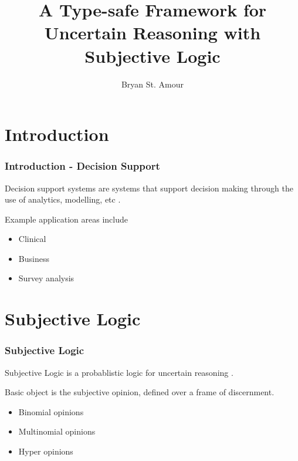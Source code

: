 \documentclass{beamer}
\title{A Type-safe Framework for Uncertain Reasoning with Subjective Logic}
\author{Bryan St. Amour}
\begin{document}
\begin{frame}
\titlepage
\end{frame}

\begin{frame}
\tableofcontents
\end{frame}


\section{Introduction}

\begin{frame}
\frametitle{Introduction - Decision Support}

Decision support systems are systems that support decision making
through the use of analytics, modelling, etc \cite{sprague_framework_1980}.

Example application areas include

\begin{itemize}
  \item Clinical \cite{berner2007clinical}
  \item Business \cite{klein_knowledge-based}
  \item Survey analysis \cite{kent2010application}
\end{itemize}

\end{frame}


\section{Subjective Logic}

\begin{frame}
\frametitle{Subjective Logic}

Subjective Logic is a probablistic logic for uncertain reasoning
\cite{josang_logic_2001}.

Basic object is the subjective opinion, defined over a frame of discernment.

\begin{itemize}
  \item Binomial opinions
  \item Multinomial opinions
  \item Hyper opinions \cite{josang2012interpretation}
\end{itemize}

\end{frame}
\end{document}

